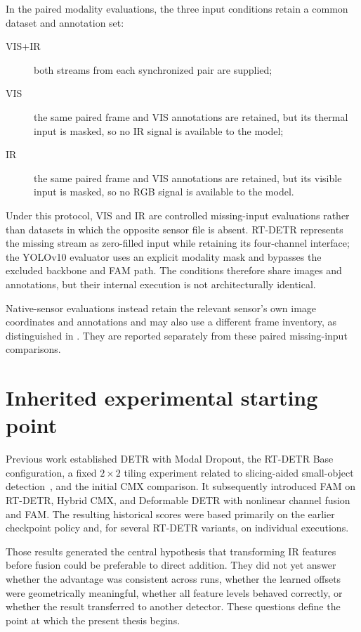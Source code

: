In the paired modality evaluations, the three input conditions retain a common
dataset and annotation set:

\begin{description}
  \item[VIS+IR] both streams from each synchronized pair are supplied;
  \item[VIS] the same paired frame and VIS annotations are retained, but its
        thermal input is masked, so no IR signal is available to the model;
  \item[IR] the same paired frame and VIS annotations are retained, but its
        visible input is masked, so no RGB signal is available to the model.
\end{description}

Under this protocol, VIS and IR are controlled missing-input evaluations rather
than datasets in which the opposite sensor file is absent. RT-DETR represents
the missing stream as zero-filled input while retaining its four-channel
interface; the YOLOv10 evaluator uses an explicit modality mask and bypasses the excluded
backbone and FAM path. The conditions therefore share images and annotations,
but their internal execution is not architecturally identical.

Native-sensor evaluations instead retain the relevant sensor's own image
coordinates and annotations and may also use a different frame inventory, as
distinguished in . They are reported separately
from these paired missing-input comparisons.

\section{Inherited experimental starting point}

Previous work established DETR with Modal Dropout, the RT-DETR Base
configuration, a fixed \(2\times2\) tiling experiment related to slicing-aided
small-object detection~\cite{akyon2022sahi}, and the initial CMX comparison.
It subsequently introduced FAM on RT-DETR, Hybrid CMX, and Deformable DETR
with nonlinear channel fusion and FAM. The resulting historical scores were
based primarily on the earlier checkpoint policy and, for several RT-DETR
variants, on individual executions.

Those results generated the central hypothesis that transforming IR features
before fusion could be preferable to direct addition. They did not yet answer
whether the advantage was consistent across runs, whether the learned offsets
were geometrically meaningful, whether all feature levels behaved correctly,
or whether the result transferred to another detector. These questions define
the point at which the present thesis begins.
